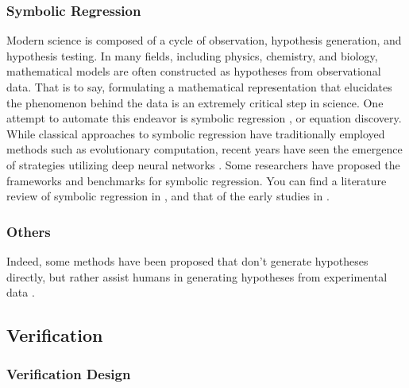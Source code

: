\documentclass{book}
\begin{document}
\subsubsection{Symbolic Regression} 

Modern science is composed of a cycle of observation, hypothesis generation, and hypothesis testing. In many fields, including physics, chemistry, and biology, mathematical models are often constructed as hypotheses from observational data. That is to say, formulating a mathematical representation that elucidates the phenomenon behind the data is an extremely critical step in science. One attempt to automate this endeavor is symbolic regression \cite{makke2022interpretable}, or equation discovery. While classical approaches to symbolic regression have traditionally employed methods such as evolutionary computation, recent years have seen the emergence of strategies utilizing deep neural networks \cite{petersen2019deep,udrescu2020ai,udrescu2020ai2,cranmer2020discovering,kamienny2022end,d2022deep}. Some researchers have proposed the frameworks \cite{landajuela2022unified,keren2023computational} and benchmarks \cite{matsubara2022rethinking} for symbolic regression. You can find a literature review of symbolic regression in \cite{makke2022interpretable}, and that of the early studies in \cite{kramer2023automated}.

\subsubsection{Others} 

Indeed, some methods have been proposed that don't generate hypotheses directly, but rather assist humans in generating hypotheses from experimental data 
 \cite{friederich2021scientific}.

\subsection{Verification}
\subsubsection{Verification Design}
\end{document}
